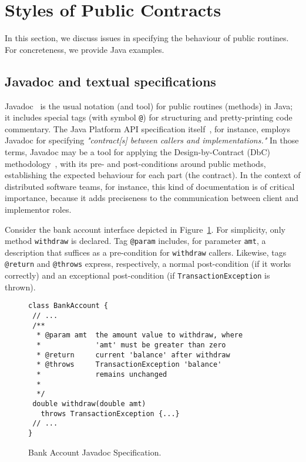 \section{Styles of Public Contracts}
\label{sec:example}

In this section, we discuss issues in specifying the behaviour of public routines. For concreteness, we provide Java examples.

\subsection{Javadoc and textual specifications}

Javadoc~\cite{javadoc-oracle} is the usual notation (and tool) for public routines (methods) in Java; it includes special tags (with symbol \texttt{@}) for structuring and pretty-printing code commentary.
The Java Platform API specification itself~\cite{java-spec}, for instance, employs Javadoc for specifying \emph{"contract[s] between callers and implementations."}
In those terms, Javadoc may be a tool for applying the Design-by-Contract (DbC) methodology~\cite{dbc}, with its pre- and post-conditions around public methods, establishing the expected behaviour for each part (the contract). In the context of distributed software teams, for instance, this kind of documentation is of critical importance, because it adds preciseness to the communication between client and implementor roles. 


Consider the bank account interface depicted in Figure~\ref{Fig-Javadoc-Bank}. For simplicity, only method {\lstinline!withdraw!} is declared. Tag \lstinline!@param! includes, for parameter \lstinline!amt!, a description that suffices as a pre-condition for \lstinline!withdraw! callers. Likewise, tags \lstinline!@return! and \lstinline!@throws! express, respectively, a normal post-condition (if it works correctly) and an exceptional post-condition (if \lstinline!TransactionException! is thrown).


\begin{figure}
\centering
\begin{lstlisting}[basicstyle=\footnotesize\ttfamily,name=figxpi]
class BankAccount {
 // ...
 /**
  * @param amt  the amount value to withdraw, where
  *             'amt' must be greater than zero 
  * @return     current 'balance' after withdraw
  * @throws     TransactionException 'balance' 
  *             remains unchanged
  *
  */
 double withdraw(double amt) 
   throws TransactionException {...}
 // ...
}
\end{lstlisting}
\caption{Bank Account Javadoc Specification.}
\label{Fig-Javadoc-Bank}
\end{figure}


